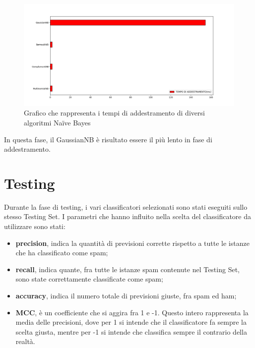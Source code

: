 \documentclass{report}
\begin{document}
    \begin{figure}[h!]
        \centering
        \includegraphics[width =\textwidth]{immagini/graficoAddestramento.png}
        \caption{Grafico che rappresenta i tempi di addestramento di diversi algoritmi Naïve Bayes}

    \end{figure}

    In questa fase, il GaussianNB è risultato essere il più lento in fase di addestramento.


    
    
\newpage
    \section{Testing}
    Durante la fase di testing, i vari classificatori selezionati sono stati eseguiti sullo stesso Testing Set.
    I parametri che hanno influito nella scelta del classificatore da utilizzare sono stati:
    \begin{itemize}
        \item {\bfseries precision}, indica la quantità di previsioni corrette rispetto a tutte le istanze che ha classificato come spam;
        \item {\bfseries recall}, indica quante, fra tutte le istanze spam contenute nel Testing Set, sono state correttamente classificate come spam;
        \item {\bfseries accuracy}, indica il numero totale di previsioni giuste, fra spam ed ham;
        \item {\bfseries MCC}, è un coefficiente che si aggira fra 1 e -1. Questo intero rappresenta la media delle precisioni, dove per 1 
        si intende che il classificatore fa sempre la scelta giusta, mentre per -1 si intende che classifica sempre il contrario della realtà.  
    \end{itemize}
\end{document}
